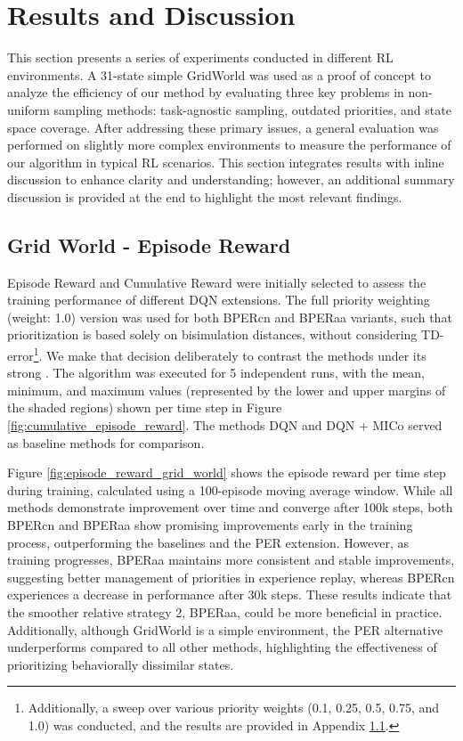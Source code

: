 
\chapter{Results and Discussion}

This section presents a series of experiments conducted in different RL environments. A 31-state simple GridWorld was used as a proof of concept to analyze the efficiency of our method by evaluating three key problems in non-uniform sampling methods: task-agnostic sampling, outdated priorities, and state space coverage. After addressing these primary issues, a general evaluation was performed on slightly more complex environments to measure the performance of our algorithm in typical RL scenarios. This section integrates results with inline discussion to enhance clarity and understanding; however, an additional summary discussion is provided at the end to highlight the most relevant findings.

\section{Grid World - Episode Reward}
Episode Reward and Cumulative Reward were initially selected to assess the training performance of different DQN extensions. The full priority weighting (weight: 1.0) version was used for both BPERcn and BPERaa variants, such that prioritization is based solely on bisimulation distances, without considering TD-error\footnote{Additionally, a sweep over various priority weights (0.1, 0.25, 0.5, 0.75, and 1.0) was conducted, and the results are provided in Appendix \ref{}.}. We make that decision deliberately to contrast the methods under its strong . The algorithm was executed for 5 independent runs, with the mean, minimum, and maximum values (represented by the lower and upper margins of the shaded regions) shown per time step in Figure \ref{fig:cumulative_episode_reward}. The methods DQN and DQN + MICo served as baseline methods for comparison.

Figure \ref{fig:episode_reward_grid_world} shows the episode reward per time step during training, calculated using a 100-episode moving average window. While all methods demonstrate improvement over time and converge after 100k steps, both BPERcn and BPERaa show promising improvements early in the training process, outperforming the baselines and the PER extension. However, as training progresses, BPERaa maintains more consistent and stable improvements, suggesting better management of priorities in experience replay, whereas BPERcn experiences a decrease in performance after 30k steps. These results indicate that the smoother relative strategy 2, BPERaa, could be more beneficial in practice. Additionally, although GridWorld is a simple environment, the PER alternative underperforms compared to all other methods, highlighting the effectiveness of prioritizing behaviorally dissimilar states.

